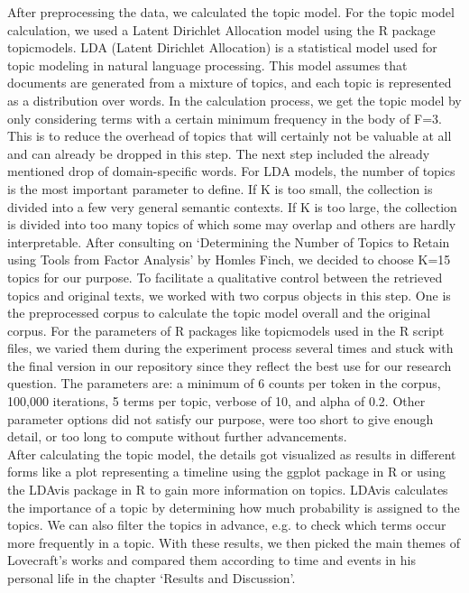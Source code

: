 After preprocessing the data, we calculated the topic model. For the topic model calculation, 
we used a Latent Dirichlet Allocation model using the R package topicmodels. LDA (Latent Dirichlet 
Allocation) is a statistical model used for topic modeling in natural language processing. This 
model assumes that documents are generated from a mixture of topics, and each topic is represented 
as a distribution over words. In the calculation process, we get the topic model by only 
considering terms with a certain minimum frequency in the body of F=3. This is to reduce the 
overhead of topics that will certainly not be valuable at all and can already be dropped in 
this step. The next step included the already mentioned drop of domain-specific words. For LDA 
models, the number of topics is the most important parameter to define. If K is too small, the 
collection is divided into a few very general semantic contexts. If K is too large, the collection 
is divided into too many topics of which some may overlap and others are hardly interpretable. 
After consulting on ‘Determining the Number of Topics to Retain using Tools from Factor Analysis’ 
by Homles Finch, we decided to choose K=15 topics for our purpose. To facilitate a qualitative 
control between the retrieved topics and original texts, we worked with two corpus objects in 
this step. One is the preprocessed corpus to calculate the topic model overall and the original 
corpus. For the parameters of R packages like topicmodels used in the R script files, we varied 
them during the experiment process several times and stuck with the final version in our repository 
since they reflect the best use for our research question. The parameters are: a minimum of 6 
counts per token in the corpus, 100,000 iterations, 5 terms per topic, verbose of 10, and alpha 
of 0.2. Other parameter options did not satisfy our purpose, were too short to give enough detail, 
or too long to compute without further advancements.\\

After calculating the topic model, the details got visualized as results in different forms 
like a plot representing a timeline using the ggplot package in R or using the LDAvis package 
in R to gain more information on topics. LDAvis calculates the importance of a topic by determining 
how much probability is assigned to the topics. We can also filter the topics in advance, e.g. 
to check which terms occur more frequently in a topic. With these results, we then picked the 
main themes of Lovecraft’s works and compared them according to time and events in his personal 
life in the chapter ‘Results and Discussion’.
